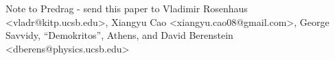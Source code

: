 \bigskip\bigskip

\noindent
Note to Predrag - send this paper to
Vladimir Rosenhaus  <vladr@kitp.ucsb.edu>,
Xiangyu Cao <xiangyu.cao08@gmail.com>,
George Savvidy, ``Demokritos'', Athens,
and
David Berenstein <dberens@physics.ucsb.edu>
